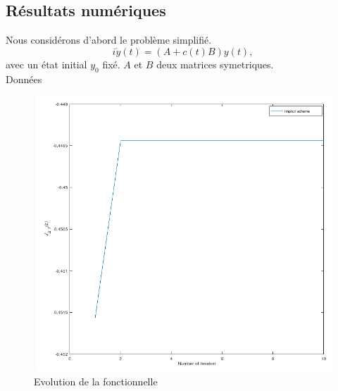 \subsection{Résultats numériques}
Nous considérons d'abord le problème simplifié.
\begin{equation}
i\dot y(t)= (A+c(t)B)y(t),
\end{equation}
avec un état initial $y_0$ fixé. $A$ et $B$ deux matrices symetriques. 
\\Données
\begin{figure}[H]
	\caption{Evolution de la fonctionnelle}
	\centering
	\includegraphics[scale=0.6]{images/implicit_func.png}
\end{figure}

